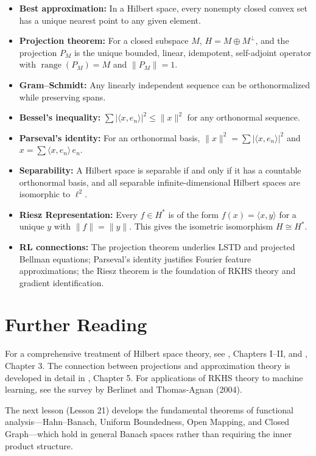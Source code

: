 \documentclass[11pt,a4paper]{article}
\begin{document}
\begin{itemize}[leftmargin=2em,nosep]
    \item \textbf{Best approximation:} In a Hilbert space, every
          nonempty closed convex set has a unique nearest point to any
          given element.
    \item \textbf{Projection theorem:} For a closed subspace $M$,
          $H = M \oplus M^\perp$, and the projection $P_M$ is the unique
          bounded, linear, idempotent, self-adjoint operator with
          $\operatorname{range}(P_M) = M$ and $\|P_M\| = 1$.
    \item \textbf{Gram--Schmidt:} Any linearly independent sequence can
          be orthonormalized while preserving spans.
    \item \textbf{Bessel's inequality:}
          $\sum |\langle x, e_n \rangle|^2 \leq \|x\|^2$ for any
          orthonormal sequence.
    \item \textbf{Parseval's identity:} For an orthonormal basis,
          $\|x\|^2 = \sum |\langle x, e_n \rangle|^2$ and
          $x = \sum \langle x, e_n \rangle\, e_n$.
    \item \textbf{Separability:} A Hilbert space is separable if and
          only if it has a countable orthonormal basis, and all separable
          infinite-dimensional Hilbert spaces are isomorphic to $\ell^2$.
    \item \textbf{Riesz Representation:} Every $f \in H^*$ is of the
          form $f(x) = \langle x, y \rangle$ for a unique $y$ with
          $\|f\| = \|y\|$. This gives the isometric isomorphism
          $H \cong H^*$.
    \item \textbf{RL connections:} The projection theorem underlies LSTD
          and projected Bellman equations; Parseval's identity justifies
          Fourier feature approximations; the Riesz theorem is the
          foundation of RKHS theory and gradient identification.
\end{itemize}


\section{Further Reading}
\label{sec:further}

For a comprehensive treatment of Hilbert space theory, see
\citet{conway1990}, Chapters I--II, and \citet{kreyszig1989},
Chapter 3. The connection between projections and approximation theory is
developed in detail in \citet{brezis2011}, Chapter 5. For applications
of RKHS theory to machine learning, see the survey by Berlinet and
Thomas-Agnan (2004).

The next lesson (Lesson 21) develops the fundamental theorems of
functional analysis---Hahn--Banach, Uniform Boundedness, Open Mapping,
and Closed Graph---which hold in general Banach spaces rather than
requiring the inner product structure.


\end{document}

